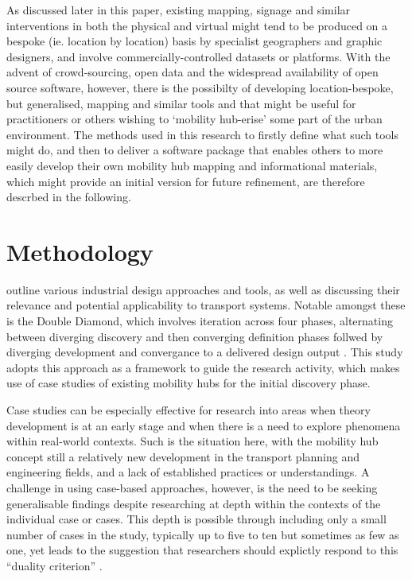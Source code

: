\documentclass[preprint, 3p,
authoryear]{elsarticle} %
\begin{document}
As discussed later in this paper, existing mapping, signage and similar
interventions in both the physical and virtual might tend to be produced
on a bespoke (ie. location by location) basis by specialist geographers
and graphic designers, and involve commercially-controlled datasets or
platforms. With the advent of crowd-sourcing, open data and the
widespread availability of open source software, however, there is the
possibilty of developing location-bespoke, but generalised, mapping and
similar tools and that might be useful for practitioners or others
wishing to `mobility hub-erise' some part of the urban environment. The
methods used in this research to firstly define what such tools might
do, and then to deliver a software package that enables others to more
easily develop their own mobility hub mapping and informational
materials, which might provide an initial version for future refinement,
are therefore descrbed in the following.

\section{Methodology}\label{methodology}

\cite{Coxon:2018aa,Coxon:2021ab} outline various industrial design
approaches and tools, as well as discussing their relevance and
potential applicability to transport systems. Notable amongst these is
the Double Diamond, which involves iteration across four phases,
alternating between diverging discovery and then converging definition
phases follwed by diverging development and convergance to a delivered
design output \cite{UK-Design-Council:0aa}. This study adopts this
approach as a framework to guide the research activity, which makes use
of case studies of existing mobility hubs for the initial discovery
phase.

Case studies can be especially effective for research into areas when
theory development is at an early stage and when there is a need to
explore phenomena within real-world contexts. Such is the situation
here, with the mobility hub concept still a relatively new development
in the transport planning and engineering fields, and a lack of
established practices or understandings. A challenge in using case-based
approaches, however, is the need to be seeking generalisable findings
despite researching at depth within the contexts of the individual case
or cases. This depth is possible through including only a small number
of cases in the study, typically up to five to ten but sometimes as few
as one, yet leads to the suggestion that researchers should explictly
respond to this ``duality criterion''
\cite{Benbasat:1987aa,Eisenhardt:1989aa,Dyer:1991aa,Cavaye:1996aa,Darke:1998aa,Meredith:1998aa,Stuart:2002aa,Voss:2002aa,Denscombe:2007aa,Eisenhardt:2007aa,Yin:2009ab,Ketokivi:2014aa,Yin:2014ab,Yin:2018ab}.
\end{document}

